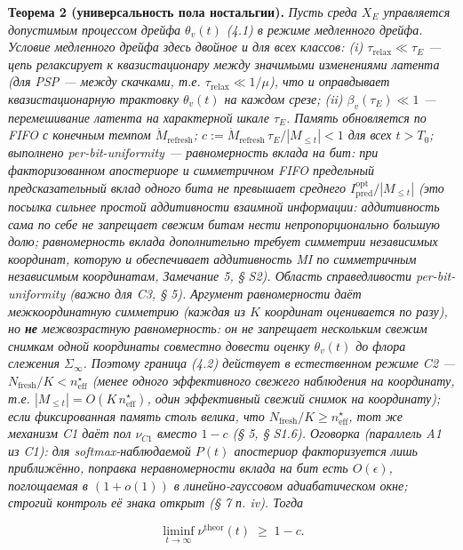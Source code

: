 \documentclass[12pt]{iopart}
\begin{document}
\textbf{Теорема 2 (универсальность пола ностальгии).} \emph{Пусть среда \(X_E\) управляется допустимым процессом дрейфа \(\theta_v(t)\) (4.1) в режиме медленного дрейфа. Условие медленного дрейфа здесь двойное и для всех классов: (i) \(\tau_{\text{relax}} \ll \tau_E\) --- цепь релаксирует к квазистационару между значимыми изменениями латента (для PSP --- между скачками, т.е. \(\tau_{\text{relax}} \ll 1/\mu\)), что и оправдывает квазистационарную трактовку \(\theta_v(t)\) на каждом срезе; (ii) \(\beta_v(\tau_E) \ll 1\) --- перемешивание латента на характерной шкале \(\tau_E\). Память обновляется по FIFO с конечным темпом \(\dot M_{\text{refresh}}\); \(c := \dot M_{\text{refresh}}\,\tau_E/|M_{\le t}| < 1\) для всех \(t > T_0\); выполнено per-bit-uniformity --- \emph{равномерность вклада на бит}: при факторизованном апостериоре и симметричном FIFO предельный предсказательный вклад одного бита не превышает среднего \(I^{\text{opt}}_{\text{pred}}/|M_{\le t}|\) (это посылка \emph{сильнее} простой аддитивности взаимной информации: аддитивность сама по себе не запрещает свежим битам нести непропорционально большую долю; равномерность вклада дополнительно требует симметрии независимых координат, которую и обеспечивает аддитивность MI по симметричным независимым координатам, \cite{Andriishin2026b} Замечание 5, § S2). \emph{Область справедливости per-bit-uniformity (важно для C3, § 5).} Аргумент равномерности даёт \emph{межкоординатную} симметрию (каждая из \(K\) координат оценивается по разу), но \textbf{не} \emph{межвозрастную} равномерность: он не запрещает нескольким свежим снимкам одной координаты \emph{совместно} довести оценку \(\theta_v(t)\) до флора слежения \(\Sigma_\infty\). Поэтому граница (4.2) действует в \emph{естественном режиме C2} --- \(N_{\text{fresh}}/K < n_{\text{eff}}^\star\) (менее одного эффективного свежего наблюдения на координату, т.е. \(|M_{\le t}| = O(K\,n_{\text{eff}}^\star)\), один эффективный свежий снимок на координату); если фиксированная память столь велика, что \(N_{\text{fresh}}/K \ge n_{\text{eff}}^\star\), тот же механизм C1 даёт пол \(\nu_{C1}\) вместо \(1-c\) (§ 5, § S1.6). Оговорка (параллель A1 из C1): для softmax-наблюдаемой \(P(t)\) апостериор факторизуется лишь приближённо, поправка неравномерности вклада на бит есть \(O(\epsilon)\), поглощаемая в \((1+o(1))\) в линейно-гауссовом адиабатическом окне; строгий контроль её знака открыт (§ 7 п. iv). Тогда}



\begin{equation}\liminf_{t\to\infty}\nu^{\text{theor}}(t) \;\ge\; 1 - c. \tag{4.2}\end{equation}
\end{document}

